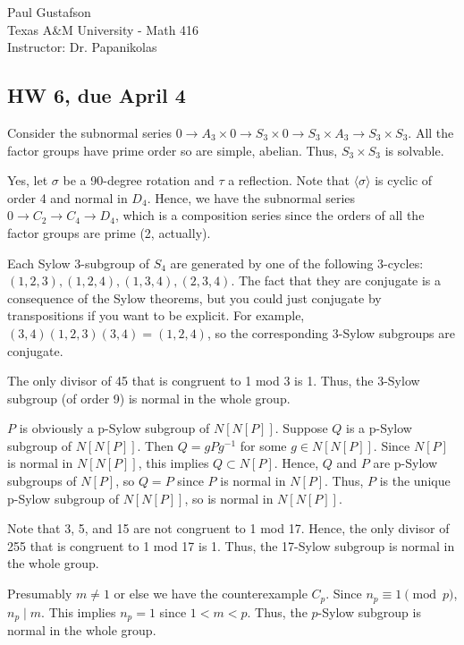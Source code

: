 \documentclass{article}
\begin{document}
\noindent Paul Gustafson\\
\noindent Texas A\&M University - Math 416\\
\noindent Instructor: Dr. Papanikolas

\subsection*{HW 6, due April 4}


 Consider the subnormal series
$0 \to A_3 \times 0 \to S_3 \times 0 \to S_3 \times A_3 \to S_3 \times S_3$.
All the factor groups have prime order so are simple, abelian. Thus, $S_3 \times S_3$ is solvable.

 Yes, let $\sigma$ be a 90-degree rotation and $\tau$ a reflection. Note that $\langle \sigma \rangle$  is cyclic of order 4 and normal in $D_4$.  Hence, we have the subnormal series $0 \to C_2 \to C_4 \to D_4$, which is a composition series since the orders of all the factor groups are prime (2, actually).

 Each Sylow 3-subgroup of $S_4$ are generated by one of the following 3-cycles: $(1, 2, 3), (1, 2, 4), (1, 3, 4), (2, 3, 4)$. The fact that they are conjugate is a consequence of the Sylow theorems, but you could just conjugate by transpositions if you want to be explicit.  For example, $(3, 4) (1, 2, 3) (3, 4) = (1, 2, 4)$, so the corresponding 3-Sylow subgroups are conjugate.

 The only divisor of 45 that is congruent to 1 mod 3 is 1. Thus, the 3-Sylow subgroup (of order 9) is normal in the whole group.

 $P$ is obviously a p-Sylow subgroup of $N[N[P]]$. Suppose $Q$ is a p-Sylow subgroup of $N[N[P]]$.  Then $Q = gPg^{-1}$ for some $g \in N[N[P]]$. Since $N[P]$ is normal in $N[N[P]]$, this implies $Q \subset N[P]$. Hence, $Q$ and $P$ are p-Sylow subgroups of $N[P]$, so $Q = P$ since $P$ is normal in $N[P]$.  Thus, $P$ is the unique p-Sylow subgroup of $N[N[P]]$, so is normal in $N[N[P]]$.

 Note that 3, 5, and 15 are not congruent to 1 mod 17.  Hence, the only divisor of 255 that is congruent to 1 mod 17 is 1.  Thus, the 17-Sylow subgroup is normal in the whole group.

 Presumably $m \neq 1$  or else we have the counterexample $C_p$.  Since $n_p  \equiv 1 \pmod p$, $n_p \mid m$. This implies $n_p = 1$ since $1 < m < p$. Thus, the $p$-Sylow subgroup is normal in the whole group.
\end{document}
